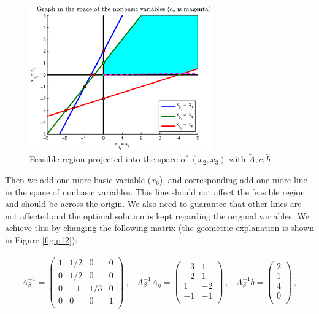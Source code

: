 \begin{figure}[h!!]
\includegraphics[width=0.7\textwidth]{p2/initial.eps}
\caption{Feasible region projected into the space of $(x_2,x_3)$ with $\tilde{A},\tilde{c},\tilde{b}$}\label{fig:p11}
\end{figure}

Then we add one more basic variable ($x_6$), and corresponding add one more line in the space of nonbasic variables. This line should not affect the feasible region and should be across the origin. We also need to guarantee that other lines are not affected and the optimal solution is kept regarding the original variables. We achieve this by changing the following matrix (the geometric explanation is shown in Figure \ref{fig:p12}):

\[
\begin{array}{ccc}
A_\beta^{-1}  =  \left(
  \begin{array}{cccc}
    1 & 1/2 & 0 & 0  \\
    0 & 1/2 & 0 & 0\\
    0 & -1 & 1/3 & 0\\
    0 & 0 & 0 & 1\\
  \end{array}
\right)~, &

A_\beta^{-1}A_\eta  =  \left(
  \begin{array}{cc}
    -3 & 1   \\
    -2 & 1 \\
    1 & -2\\
    -1 & -1 \\
  \end{array}
\right)~,&

A_\beta^{-1}b  =  \left(
  \begin{array}{c}
    2   \\
    1 \\
    4\\
    0\\
  \end{array}
\right)~,

\end{array}
\]

